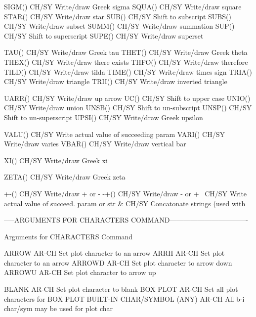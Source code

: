 SIGM()                      CH/SY Write/draw Greek sigma
SQUA()                      CH/SY Write/draw square
STAR()                      CH/SY Write/draw star
SUB()                       CH/SY Shift to subscript
SUBS()                      CH/SY Write/draw subset
SUMM()                      CH/SY Write/draw summation
SUP()                       CH/SY Shift to superscript
SUPE()                      CH/SY Write/draw superset

TAU()                       CH/SY Write/draw Greek tau
THET()                      CH/SY Write/draw Greek theta
THEX()                      CH/SY Write/draw there exists
THFO()                      CH/SY Write/draw therefore
TILD()                      CH/SY Write/draw tilda
TIME()                      CH/SY Write/draw times sign
TRIA()                      CH/SY Write/draw triangle
TRII()                      CH/SY Write/draw inverted triangle

UARR()                      CH/SY Write/draw up arrow
UC()                        CH/SY Shift to upper case
UNIO()                      CH/SY Write/draw union
UNSB()                      CH/SY Shift to un-subscript
UNSP()                      CH/SY Shift to un-superscript
UPSI()                      CH/SY Write/draw Greek upsilon

VALU()                      CH/SY Write actual value of succeeding param
VARI()                      CH/SY Write/draw varies
VBAR()                      CH/SY Write/draw vertical bar

XI()                        CH/SY Write/draw Greek xi

ZETA()                      CH/SY Write/draw Greek zeta

+-()                        CH/SY Write/draw + or -
-+()                        CH/SY Write/draw - or +
\                           CH/SY Write actual value of succeed. param or str
&                           CH/SY Concatonate strings (used with \)

-----ARGUMENTS FOR CHARACTERS COMMAND----------------------------------

Arguments for CHARACTERS Command

ARROW                       AR-CH Set plot character to an arrow
ARRH                        AR-CH Set plot character to an arrow
ARROWD                      AR-CH Set plot character to arrow down
ARROWU                      AR-CH Set plot character to arrow up

BLANK                       AR-CH Set plot character to blank
BOX PLOT                    AR-CH Set all plot characters for BOX PLOT
BUILT-IN CHAR/SYMBOL (ANY)  AR-CH All b-i char/sym may be used for plot char

